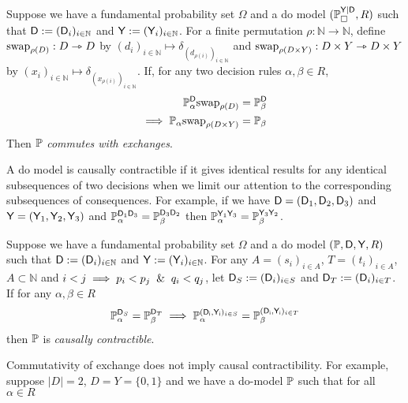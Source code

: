 \begin{definition}\label{def:caus_exch}
Suppose we have a fundamental probability set $\Omega$ and a do model $(\mathbb{P}_{\square}^{\mathsf{Y}|\mathsf{D}},R)$ such that $\mathsf{D}:=(\mathsf{D}_i)_{i\in \mathbb{N}}$ and $\mathsf{Y}:=(\mathsf{Y}_i)_{i\in\mathbb{N}}$. For a finite permutation $\rho:\mathbb{N}\to\mathbb{N}$, define $\text{swap}_{\rho(D)}:D\rightarrowtriangle D$ by $(d_i)_{i\in\mathbb{N}}\mapsto \delta_{(d_{\rho(i)})_{i\in\mathbb{N}}}$ and $\text{swap}_{\rho(D\times Y)}:D\times Y\rightarrowtriangle D\times Y$ by $(x_i)_{i\in\mathbb{N}}\mapsto \delta_{(x_{\rho(i)})_{i\in\mathbb{N}}}$. If, for any two decision rules $\alpha,\beta \in R$,
\begin{align}
    \mathbb{P}_\alpha^{\mathsf{D}}\text{swap}_{\rho(D)} &= \mathbb{P}_{\beta}^{\mathsf{D}}\\
    \implies  \mathbb{P}_\alpha\text{swap}_{\rho(D\times Y)}&=\mathbb{P}_\beta
\end{align}
Then $\mathbb{P}$ \emph{commutes with exchanges}.
\end{definition}

A do model is causally contractible if it gives identical results for any identical subsequences of two decisions when we limit our attention to the corresponding subsequences of consequences. For example, if we have $\mathsf{D}=(\mathsf{D}_1,\mathsf{D}_2,\mathsf{D}_3)$ and $\mathsf{Y}=(\mathsf{Y}_1,\mathsf{Y}_2,\mathsf{Y}_3)$ and $\mathbb{P}_\alpha^{\mathsf{D}_1\mathsf{D}_3}=\mathbb{P}_\beta^{\mathsf{D}_3\mathsf{D}_2}$ then $\mathbb{P}_{\alpha}^{\mathsf{Y}_1\mathsf{Y}_3}=\mathbb{P}_\beta^{\mathsf{Y}_3\mathsf{Y}_2}$.

\begin{definition}\label{def:caus_cont}
Suppose we have a fundamental probability set $\Omega$ and a do model $(\mathbb{P},\mathsf{D},\mathsf{Y},R)$ such that $\mathsf{D}:=(\mathsf{D}_i)_{i\in \mathbb{N}}$ and $\mathsf{Y}:=(\mathsf{Y}_i)_{i\in\mathbb{N}}$. For any $A=(s_i)_{i\in A}$, $T=(t_i)_{i\in A}$, $A\subset\mathbb{N}$ and $i<j\implies p_i<p_j \And q_i<q_j$, let $\mathsf{D}_S:=(\mathsf{D}_i)_{i\in S}$ and $\mathsf{D}_T:=(\mathsf{D}_i)_{i\in T}$. If for any $\alpha,\beta\in R$
\begin{align}
    \mathbb{P}_\alpha^{\mathsf{D}_{S}}=\mathbb{P}_\beta^{\mathsf{D}_{T}}\implies \mathbb{P}_\alpha^{(\mathsf{D_i,Y_i})_{i\in S}}=\mathbb{P}_\beta^{(\mathsf{D_i,Y_i})_{i\in T}}
\end{align}
then $\mathbb{P}$ is \emph{causally contractible}.
\end{definition}

Commutativity of exchange does not imply causal contractibility. For example, suppose $|D|=2$, $D=Y=\{0,1\}$ and we have a do-model $\mathbb{P}$ such that for all $\alpha\in R$

